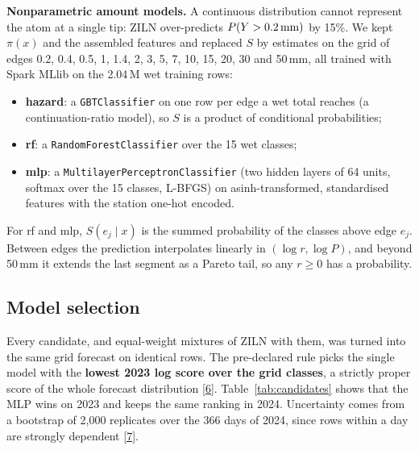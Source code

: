 \documentclass[lang=en,11pt,a4paper,bibend=bibtex]{elegantpaper}
\newcommand{\mm}{\,mm}
\begin{document}
\textbf{Nonparametric amount models.} A continuous distribution cannot represent the atom at a single tip: ZILN over-predicts $P(Y>0.2\text{\mm})$ by 15\%. We kept $\pi(x)$ and the assembled features and replaced $S$ by estimates on the grid of edges 0.2, 0.4, 0.5, 1, 1.4, 2, 3, 5, 7, 10, 15, 20, 30 and 50\mm, all trained with Spark MLlib on the 2.04\,M wet training rows:
\begin{itemize}[leftmargin=1.5em,itemsep=3pt]
\item \textbf{hazard}: a \texttt{GBTClassifier} on one row per edge a wet total reaches (a continuation-ratio model), so $S$ is a product of conditional probabilities;
\item \textbf{rf}: a \texttt{RandomForestClassifier} over the 15 wet classes;
\item \textbf{mlp}: a \texttt{MultilayerPerceptronClassifier} (two hidden layers of 64 units, softmax over the 15 classes, L-BFGS) on asinh-transformed, standardised features with the station one-hot encoded.
\end{itemize}
For rf and mlp, $S(e_j\mid x)$ is the summed probability of the classes above edge $e_j$. Between edges the prediction interpolates linearly in $(\log r, \log P)$, and beyond 50\mm{} it extends the last segment as a Pareto tail, so any $r\ge0$ has a probability.

\subsection{Model selection}
Every candidate, and equal-weight mixtures of ZILN with them, was turned into the same grid forecast on identical rows. The pre-declared rule picks the single model with the \textbf{lowest 2023 log score over the grid classes}, a strictly proper score of the whole forecast distribution \hyperref[ref:6]{[6]}. Table~\ref{tab:candidates} shows that the MLP wins on 2023 and keeps the same ranking in 2024. Uncertainty comes from a bootstrap of 2,000 replicates over the 366 days of 2024, since rows within a day are strongly dependent \hyperref[ref:7]{[7]}.
\end{document}
